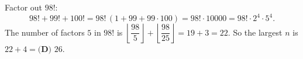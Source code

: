 Factor out $98!$:
\[98!+99!+100!=98!\,(1+99+99\cdot100)=98!\cdot10000=98!\cdot2^4\cdot5^4.\]
The number of factors $5$ in $98!$ is $\left\lfloor\dfrac{98}{5}\right\rfloor+\left\lfloor\dfrac{98}{25}\right\rfloor=19+3=22$. So the largest $n$ is $22+4=\boxed{\textbf{(D) }26}$.
